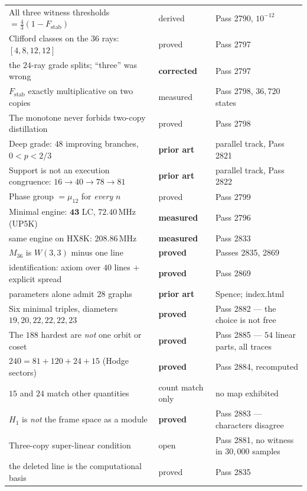 \documentclass[11pt,a4paper]{article}
\newcommand{\cmd}[1]{{\ttfamily #1}}
\begin{document}
{\begin{center}
\begin{tabular}{@{}p{8.4cm}p{2.4cm}p{3.9cm}@{}}
All three witness thresholds $=\frac43(1-F_{\mathrm{stab}})$ & derived & Pass 2790, $10^{-12}$\\
Clifford classes on the $36$ rays: $[4,8,12,12]$ & proved & Pass 2797\\
\quad the $24$-ray grade splits; ``three'' was wrong & \textbf{corrected} & Pass 2797\\
$F_{\mathrm{stab}}$ exactly multiplicative on two copies & measured & Pass 2798, $36{,}720$ states\\
The monotone never forbids two-copy distillation & proved & Pass 2798\\
Deep grade: $48$ improving branches, $0<p<2/3$ & \textbf{prior art} & parallel track, Pass 2821\\
Support is not an execution congruence: $16{\to}40{\to}78{\to}81$ & \textbf{prior art} & parallel track, Pass 2822\\
Phase group $=\mu_{12}$ for \emph{every} $n$ & proved & Pass 2799\\
Minimal engine: $\mathbf{43}$ LC, $72.40$\,MHz (UP5K) & \textbf{measured} & Pass 2796\\
\quad same engine on HX8K: $\mathbf{208.86}$\,MHz & \textbf{measured} & Pass 2833\\
$M_{36}$ is $W(3,3)$ minus one line & \textbf{proved} & Passes 2835, 2869\\
\quad identification: axiom over $40$ lines $+$ explicit spread & \textbf{proved} & Pass 2869\\
\quad parameters alone admit $28$ graphs & \textbf{prior art} & Spence; \cmd{index.html}\\
Six minimal triples, diameters $19,20,22,22,22,23$ & \textbf{proved} & Pass 2882 --- the choice is not free\\
The $188$ hardest are \emph{not} one orbit or coset & \textbf{proved} & Pass 2885 --- $54$ linear parts, all traces\\
$240 = 81+120+24+15$ (Hodge sectors) & \textbf{proved} & Pass 2884, recomputed\\
\quad $15$ and $24$ match other quantities & \textcolor{bad}{count match only} & no map exhibited\\
$H_1$ is \emph{not} the frame space as a module & \textbf{proved} & Pass 2883 --- characters disagree\\
Three-copy super-linear condition & \textcolor{bad}{open} & Pass 2881, no witness in $30{,}000$ samples\\
\quad the deleted line is the computational basis & proved & Pass 2835\\

\end{tabular}
\end{center}}
\end{document}
